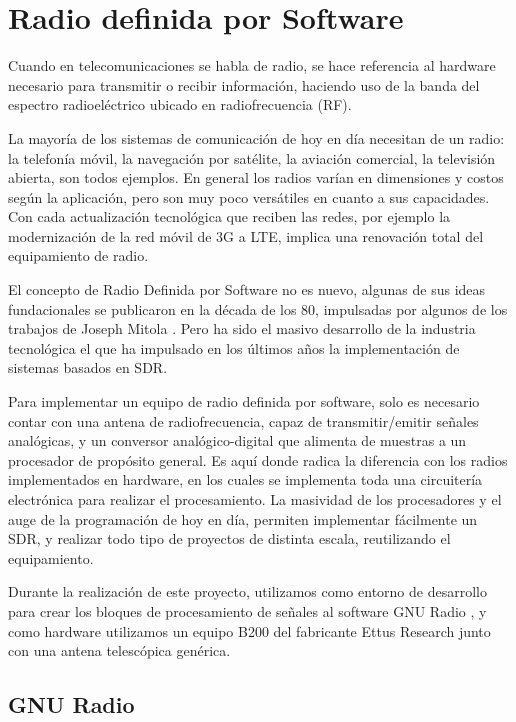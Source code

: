 \chapter{Radio definida por Software}

Cuando en telecomunicaciones se habla de radio, se hace referencia al hardware necesario para transmitir o recibir información, haciendo uso de la banda del espectro radioeléctrico ubicado en radiofrecuencia (\gls{RF}).

La mayoría de los sistemas de comunicación de hoy en día necesitan de un radio: la telefonía móvil,  la navegación por satélite, la aviación comercial, la televisión abierta, son todos ejemplos. En general los radios varían en dimensiones y costos según la aplicación, pero son muy poco versátiles en cuanto a sus capacidades. Con cada actualización tecnológica que reciben las redes, por ejemplo la modernización de la red móvil de 3G a \gls{LTE}, implica una renovación total del equipamiento de radio. 

El concepto de Radio Definida por Software no es nuevo, algunas de sus ideas fundacionales se publicaron en la década de los 80, impulsadas por algunos de los trabajos de Joseph Mitola \cite{mitola_SDR}. Pero ha sido el masivo desarrollo de la industria tecnológica el que ha impulsado en los últimos años la implementación de sistemas basados en SDR. 

Para implementar un equipo de radio definida por software, solo es necesario contar con una antena de radiofrecuencia, capaz de transmitir/emitir señales analógicas, y un conversor analógico-digital que alimenta de muestras a un procesador de propósito general. Es aquí donde radica la diferencia con los radios implementados en hardware, en los cuales se implementa toda una circuitería electrónica para realizar el procesamiento. La masividad de los procesadores y el auge de la programación de hoy en día, permiten implementar fácilmente un SDR, y realizar todo tipo de proyectos de distinta escala, reutilizando el equipamiento. 

Durante la realización de este proyecto, utilizamos como entorno de desarrollo para crear los bloques de procesamiento de señales al software GNU Radio \cite{GNURadio}, y como hardware utilizamos un equipo B200 del fabricante Ettus Research \cite{EttusResearch} junto con una antena telescópica genérica. 

\section{GNU Radio}

